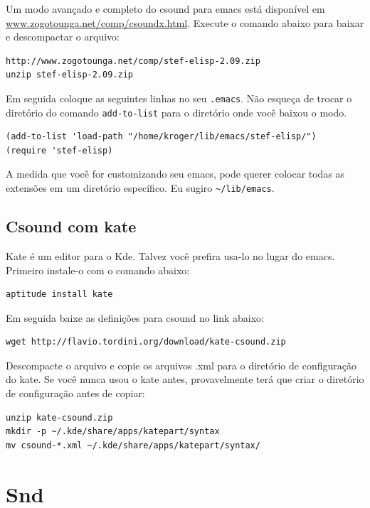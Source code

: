 \documentclass[12pt,brazil]{book}
\begin{document}
Um modo avançado e completo do csound para emacs está disponível em
\url{www.zogotounga.net/comp/csoundx.html}. Execute o comando abaixo
para baixar e descompactar o arquivo:

\begin{verbatim}
http://www.zogotounga.net/comp/stef-elisp-2.09.zip
unzip stef-elisp-2.09.zip
\end{verbatim}

Em seguida coloque as seguintes linhas no seu \texttt{.emacs}. Não
esqueça de trocar o diretório do comando \texttt{add-to-list} para o
diretório onde você baixou o modo.

\begin{verbatim}
(add-to-list 'load-path "/home/kroger/lib/emacs/stef-elisp/")
(require 'stef-elisp)
\end{verbatim}

A medida que você for customizando seu emacs, pode querer colocar
todas as extensões em um diretório específico. Eu sugiro
\verb|~/lib/emacs|.

\section{Csound com kate}
\label{sec:csound-com-kate}

Kate é um editor para o Kde. Talvez você prefira usa-lo no lugar do
emacs. Primeiro instale-o com o comando abaixo:

\begin{verbatim}
aptitude install kate
\end{verbatim}

Em seguida baixe as definições para csound no link abaixo:

\begin{verbatim}
wget http://flavio.tordini.org/download/kate-csound.zip
\end{verbatim}

Descompacte o arquivo e copie os arquivos .xml para o diretório de
configuração do kate. Se você nunca usou o kate antes, provavelmente
terá que criar o diretório de configuração antes de copiar:

\begin{verbatim}
unzip kate-csound.zip
mkdir -p ~/.kde/share/apps/katepart/syntax
mv csound-*.xml ~/.kde/share/apps/katepart/syntax/
\end{verbatim}

\chapter{Snd}
\label{cha:snd}
\end{document}
